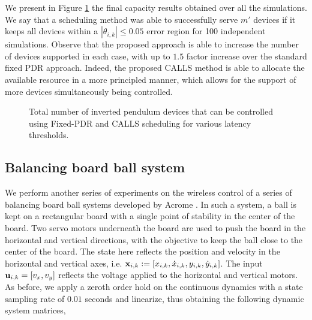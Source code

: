 We present in Figure \ref{fig_ip_bar} the final capacity results obtained over all the simulations. We say that a scheduling method was able to successfully serve $m'$ devices if it keeps all devices within a  $|\theta_{i,k}| \leq 0.05$ error region for 100 independent simulations. Observe that the proposed approach is able to increase the number of devices supported in each case, with up to $1.5$ factor increase over the standard fixed PDR approach. Indeed, the proposed CALLS method is able to allocate the available resource in a more principled manner, which allows for the support of more devices simultaneously being controlled. 

\begin{figure}
\centering
{}
\caption{Total number of inverted pendulum devices that can be controlled using Fixed-PDR and CALLS scheduling for various latency thresholds.}
\label{fig_ip_bar}
\end{figure}



\subsection{Balancing board ball system}

We perform another series of experiments on the wireless control of a series of balancing board ball systems developed by Acrome \cite{acrome}. In such a system, a ball is kept on a rectangular board with a single point of stability in the center of the board. Two servo motors underneath the board are used to push the board in the horizontal and vertical directions, with the objective to keep the ball close to the center of the board. The state here reflects the position and velocity in the horizontal and vertical axes, i.e. ${\mathbf x}_{i,k} := [x_{i,k}, \dot{x}_{i,k}, y_{i,k}, \dot{y}_{i,k}]$.  The input ${\mathbf u}_{i,k} = [v_x, v_y]$ reflects the voltage applied to the horizontal and vertical motors. As before, we apply a zeroth order hold on the continuous dynamics with a state sampling rate of $0.01$ seconds and linearize, thus obtaining the following dynamic system matrices,
%

